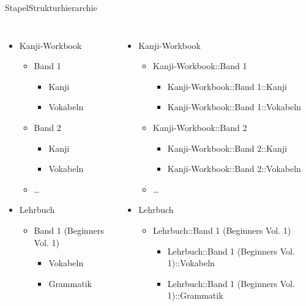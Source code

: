 \documentclass[aspectratio=169,compress]{beamer}
\begin{document}
\begin{frame}{Stapel}{Strukturhierarchie}
	\begin{columns}[c]
	\begin{itemize}
		\item Kanji-Workbook
		\begin{itemize}
			\item Band 1
			\begin{itemize}
				\item Kanji
				\item Vokabeln
			\end{itemize}
			\item Band 2
			\begin{itemize}
				\item Kanji
				\item Vokabeln
			\end{itemize}
			\item …
		\end{itemize}
		\item Lehrbuch
		\begin{itemize}
			\item Band 1 (Beginners Vol. 1)
			\begin{itemize}
				\item Vokabeln
				\item Grammatik
			\end{itemize}
		\end{itemize}
	\end{itemize}
	\pause {}
	\begin{itemize}
		\item Kanji-Workbook
		\begin{itemize}
			\item Kanji-Workbook::Band 1
			\begin{itemize}
				\item Kanji-Workbook::Band 1::Kanji
				\item Kanji-Workbook::Band 1::Vokabeln
			\end{itemize}
			\item Kanji-Workbook::Band 2
			\begin{itemize}
				\item Kanji-Workbook::Band 2::Kanji
				\item Kanji-Workbook::Band 2::Vokabeln
			\end{itemize}
			\item …
		\end{itemize}
		\item Lehrbuch
		\begin{itemize}
			\item Lehrbuch::Band 1 (Beginners Vol. 1)
			\begin{itemize}
				\item Lehrbuch::Band 1 (Beginners Vol. 1)::Vokabeln
				\item Lehrbuch::Band 1 (Beginners Vol. 1)::Grammatik
			\end{itemize}
		\end{itemize}
	\end{itemize}
	\end{columns}
\end{frame}
\end{document}
